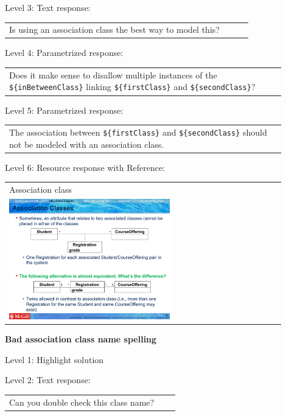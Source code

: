 \noindent Level 3: Text response: \medskip

\begin{tabular}{|p{0.9\linewidth}}
Is using an association class the best way to model this?
\end{tabular} \medskip

\noindent Level 4: Parametrized response: \medskip

\begin{tabular}{|p{0.9\linewidth}}
Does it make sense to disallow multiple instances of the \verb|${inBetweenClass}| linking \verb|${firstClass}| and \verb|${secondClass}|?
\end{tabular} \medskip

\noindent Level 5: Parametrized response: \medskip

\begin{tabular}{|p{0.9\linewidth}}
The association between \verb|${firstClass}| and \verb|${secondClass}| should not be modeled with an association class.
\end{tabular} \medskip

\noindent Level 6: Resource response with Reference: \medskip

\begin{tabular}{|p{0.9\linewidth}}
Association class

\\
\includegraphics[width=0.6\textwidth]{images/association_class.png}
\end{tabular} \medskip


\noindent \textbf{Bad association class name spelling} \medskip

\noindent Level 1: Highlight solution \medskip

\noindent Level 2: Text response: \medskip

\begin{tabular}{|p{0.9\linewidth}}
Can you double check this class name?
\end{tabular} \medskip

